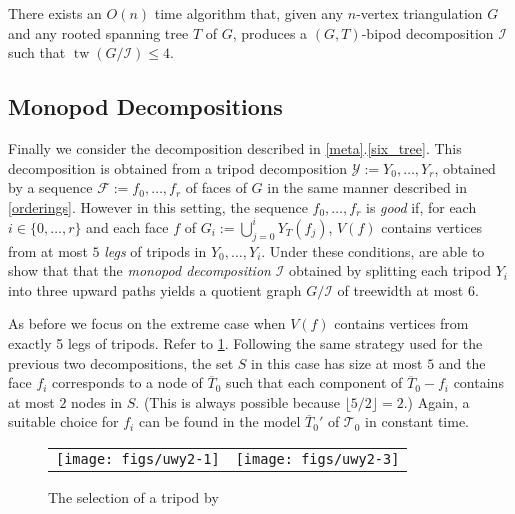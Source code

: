 \documentclass[a4paper,UKenglish,autoref]{lipics-v2021}
\DeclareMathOperator{\tw}{tw}
\begin{document}
\begin{thm}\label{bipod_decomposition_algorithm}
  There exists an $O(n)$ time algorithm that, given any $n$-vertex triangulation $G$ and any rooted spanning tree $T$ of $G$, produces a $(G,T)$-bipod decomposition $\mathcal{I}$ such that $\tw(G/\mathcal{I})\le 4$.
\end{thm}


\subsection{Monopod Decompositions}

Finally we consider the decomposition described in \cref{meta}.\ref{six_tree}.   This decomposition is obtained from a tripod decomposition $\mathcal{Y}:=Y_0,\ldots,Y_r$, obtained by a sequence $\mathcal{F}:=f_0,\ldots,f_r$ of faces of $G$ in the same manner described in \cref{orderings}.  However in this setting, the sequence $f_0,\ldots,f_r$ is \emph{good} if, for each $i\in\{0,\ldots,r\}$ and each face $f$ of $G_i:=\bigcup_{j=0}^i Y_T(f_j)$, $V(f)$ contains vertices from at most $5$ \emph{legs} of tripods in $Y_{0},\ldots,Y_i$.  Under these conditions, \citet{ueckerdt.wood.ea:improved} are able to show that that the \emph{monopod decomposition} $\mathcal{I}$ obtained by splitting each tripod $Y_i$ into three upward paths yields a quotient graph $G/\mathcal{I}$ of treewidth at most $6$.

As before we focus on the extreme case when $V(f)$ contains vertices from exactly 5 legs of tripods. Refer to \cref{uwy}. Following the same strategy used for the previous two decompositions, the set $S$ in this case has size at most $5$ and the face $f_i$ corresponds to a node of $\overline{T}_0$ such that each component of $\overline{T}_0-f_i$ contains at most $2$ nodes in $S$.  (This is always possible because $\lfloor 5/2\rfloor=2$.)  Again, a suitable choice for $f_i$ can be found in the model $\overline{T}_0'$ of $\mathcal{T}_0$ in constant time.

\begin{figure}[htbp]
  \begin{center}
    \begin{tabular}{cc}
       \texttt{[image: figs/uwy2-1]} &
       \texttt{[image: figs/uwy2-3]}
     \end{tabular}
  \end{center}
  \caption{The selection of a tripod by \citet{ueckerdt.wood.ea:improved}}
  \label{uwy}
\end{figure}
\end{document}
